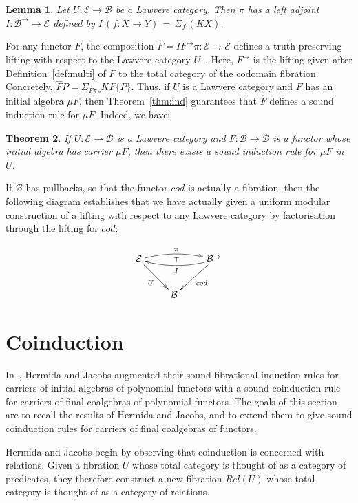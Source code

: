 \documentclass{LMCS}
\newcommand\E{{\mathcal E}}
\newcommand\B{{\mathcal B}}
\theoremstyle{plain}
\newtheorem{theorem}{Theorem}[section]
\newtheorem{lemma}[theorem]{Lemma}
\theoremstyle{remark}
\theoremstyle{definition}
\begin{document}
\begin{lemma}\label{lem:deflifting}
  Let $U:\E \rightarrow \B$ be a Lawvere category. Then $\pi$ has a
  left adjoint $I:\B^{\rightarrow} \rightarrow \E$ defined by $I \,(f
  : X \rightarrow Y)\, =\, \Sigma_f\, (K X)$.
\end{lemma}
\noindent
For any functor $F$, the composition $\hat{F} = I F^{\to} \pi : \E
\rightarrow \E$ defines a truth-preserving lifting with respect to the
Lawvere category $U$~\cite{gjf11}. Here, $F^{\to}$ is the lifting
given after Definition~\ref{def:multi} of $F$ to the total category of
the codomain fibration. Concretely, $\hat{F}P = \Sigma_{F \pi_P} K F
\{P\}$. Thus, if $U$ is a Lawvere category and $F$ has an initial
algebra $\mu F$, then Theorem~\ref{thm:ind} guarantees that $\hat F$
defines a sound induction rule for $\mu F$. Indeed, we have:

\begin{theorem}\label{thm:inda}
If $U:\E \to \B$ is a Lawvere category and $F : \B \to \B$ is a
functor whose initial algebra has carrier $\mu F$, then there exists a
sound induction rule for $\mu F$ in $U$.
\end{theorem}
\noindent
If $\B$ has pullbacks, so that the functor $\mathit{cod}$ is actually
a fibration, then the following diagram establishes that we have
actually given a uniform modular construction of a lifting with
respect to any Lawvere category by factorisation through the lifting
for $\mathit{cod}$:

\[\xymatrix{{\E}\ar[dr]_U \ar@/^/[rr]^\pi \ar@{}[rr]|\top & &
   \ar@/^/[ll]^I \ar[ld]^{cod} {\B^\to}\\ & {\B} & }\]

\section{Coinduction}\label{sec:coind}

In~\cite{hj98}, Hermida and Jacobs augmented their sound fibrational
induction rules for carriers of initial algebras of polynomial
functors with a sound coinduction rule for carriers of final
coalgebras of polynomial functors. The goals of this section are to
recall the results of Hermida and Jacobs, and to extend them to give
sound coinduction rules for carriers of final coalgebras of functors.

Hermida and Jacobs begin by observing that coinduction is concerned
with relations. Given a fibration $U$ whose total category is thought
of as a category of predicates, they therefore construct a new
fibration $Rel(U)$ whose total category is thought of as a category of
relations.
\end{document}

